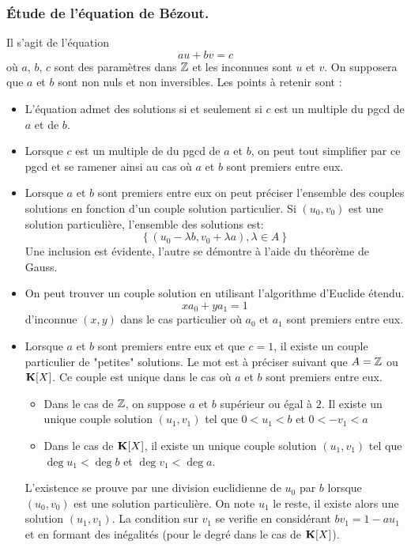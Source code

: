 \begin{propn}
\subsubsection{\'Etude de l'équation de Bézout.}
Il s'agit de l'équation
\begin{displaymath}
 au+bv=c
\end{displaymath}
où $a$, $b$, $c$ sont des paramètres dans $\mathbb{Z}$ et les inconnues sont $u$ et $v$. On supposera que $a$ et $b$ sont non nuls et non inversibles. Les points à retenir sont :
\begin{itemize}
 \item L'équation admet des solutions si et seulement si $c$ est un multiple du pgcd de $a$ et de $b$.
\item Lorsque $c$ est un multiple de du pgcd de $a$ et $b$, on peut tout simplifier par ce pgcd et se ramener ainsi au cas où $a$ et $b$ sont premiers entre eux.
\item Lorsque $a$ et $b$ sont premiers entre eux on peut préciser l'ensemble des couples solutions en fonction d'un couple solution particulier. Si $(u_0,v_0)$ est une solution particulière, l'ensemble des solutions est:
\begin{displaymath}
 \left\lbrace (u_0-\lambda b, v_0+\lambda a),\lambda \in A\right\rbrace 
\end{displaymath}
Une inclusion est évidente, l'autre se démontre à l'aide du théorème de Gauss.
\item  On peut trouver un couple solution en utilisant l'algorithme d'Euclide étendu.
\begin{displaymath}
 xa_0 + ya_1 =1
\end{displaymath}
 d'inconnue $(x,y)$ dans le cas particulier où $a_0$ et $a_1$ sont premiers entre eux.

\item Lorsque $a$ et $b$ sont premiers entre eux et que $c=1$, il existe un couple particulier de "petites" solutions. Le mot est à préciser suivant que $A=\mathbb{Z}$ ou $\mathbf{K}[X]$. Ce couple est unique dans le cas où $a$ et $b$ sont premiers entre eux.\begin{itemize}
 \item Dans le cas de $\mathbb{Z}$, on suppose $a$ et $b$ supérieur ou égal à $2$. Il existe un unique couple solution $(u_1,v_1)$ tel que $0<u_1<b$ et $0<-v_1<a$
\item Dans le cas de $\mathbf{K}[X]$, il existe un unique couple solution $(u_1,v_1)$ tel que $\deg u_1 < \deg b$ et $\deg v_1<\deg a$.
\end{itemize}
L'existence se prouve par une division euclidienne de $u_0$ par $b$ lorsque $(u_0,v_0)$ est une solution particulière. On note $u_1$ le reste, il existe alors une solution $(u_1,v_1)$. La condition sur $v_1$ se verifie en considérant $bv_1 = 1- au_1$ et en formant des inégalités (pour le degré dans le cas de $\mathbf{K}[X]$).
\end{itemize}



\end{propn}
